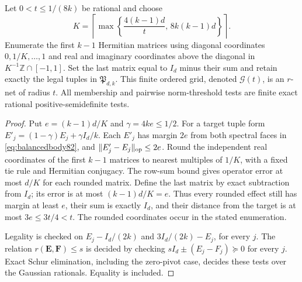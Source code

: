 \begin{lemma}
\label{lem:multigrid82}
Let $0<t\le1/(8k)$ be rational and choose
\begin{equation}\label{eq:multigriddenominator82}
 K=\left\lceil\max\left\{\frac{4(k-1)d}{t},\,8k(k-1)d\right\}\right\rceil.
\end{equation}
Enumerate the first $k-1$ Hermitian matrices using diagonal
coordinates $0,1/K,\ldots,1$ and real and imaginary coordinates
above the diagonal in $K^{-1}\mathbb Z\cap[-1,1]$.
Set the last matrix equal to $I_d$ minus their sum and retain
exactly the legal tuples in $\mathfrak P_{d,k}$.  This finite
ordered grid, denoted $\mathcal G(t)$, is an $r$-net of radius $t$.
All membership and pairwise norm-threshold tests are finite exact
rational positive-semidefinite tests.
\end{lemma}
\begin{proof}
Put $e=(k-1)d/K$ and $\gamma=4ke\le1/2$.
For a target tuple form
$E'_j=(1-\gamma)E_j+\gamma I_d/k$.
Each $E'_j$ has margin $2e$ from both spectral faces in
\eqref{eq:balancedbody82}, and $\|E'_j-E_j\|_{\rm op}\le2e$.
Round the independent real coordinates of the first $k-1$ matrices
to nearest multiples of $1/K$, with a fixed tie rule and Hermitian
conjugacy.  The row-sum bound gives operator error at most $d/K$
for each rounded matrix.  Define the last matrix by exact
subtraction from $I_d$; its error is at most $(k-1)d/K=e$.
Thus every rounded effect still has margin at least $e$, their sum
is exactly $I_d$, and their distance from the target is at most
$3e\le3t/4<t$.  The rounded coordinates occur in the stated enumeration.

Legality is checked on
$E_j-I_d/(2k)$ and $3I_d/(2k)-E_j$, for every $j$.
The relation $r(\boldsymbol E,\boldsymbol F)\le s$ is decided by
checking $sI_d\pm(E_j-F_j)\succeq0$ for every $j$.
Exact Schur elimination, including the zero-pivot case, decides
these tests over the Gaussian rationals.  Equality is included.
\end{proof}

